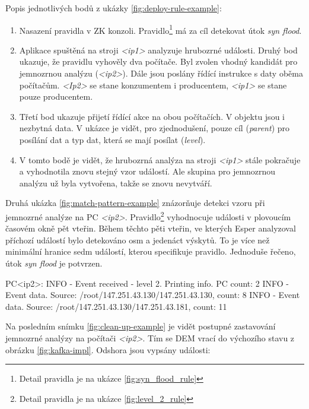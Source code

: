 \documentclass[
  digital, %
  table,   %
  nolof,     %
  nolot,     %
  oneside, %
  nocover,
  monochrome,
  12pt
]{fithesis3}
\begin{document}
Popis jednotlivých bodů z ukázky \ref{fig:deploy-rule-example}:
\begin{enumerate}
  \item Nasazení pravidla v ZK konzoli. Pravidlo\footnote{Detail pravidla je na ukázce \ref{fig:syn_flood_rule}} má za cíl detekovat útok \textit{syn flood}.
  \item Aplikace spuštěná na stroji \textit{<ip1>} analyzuje hrubozrné události. Druhý bod ukazuje, že pravidlu vyhověly dva počítače. Byl zvolen vhodný kandidát pro jemnozrnou analýzu (\textit{<ip2>}). Dále jsou poslány řídící instrukce s daty oběma počítačům. \textit{<Ip2>} se stane konzumentem i producentem, \textit{<ip1>} se stane pouze producentem.
  \item Třetí bod ukazuje přijetí řídící akce na obou počítačích. V objektu jsou i nezbytná data. V ukázce je vidět, pro zjednodušení, pouze cíl (\textit{parent}) pro posílání dat a typ dat, která se mají posílat (\textit{level}).
  \item V tomto bodě je vidět, že hrubozrná analýza na stroji \textit{<ip1>} stále pokračuje a vyhodnotila znovu stejný vzor událostí. Ale skupina pro jemnozrnou analýzu už byla vytvořena, takže se znovu nevytváří.
\end{enumerate}

Druhá ukázka \ref{fig:match-pattern-example} znázorňuje detekci vzoru při jemnozrné analýze na PC \textit{<ip2>}. Pravidlo\footnote{Detail pravidla je na ukázce \ref{fig:level_2_rule}} vyhodnocuje události v plovoucím časovém okně pět vteřin. Během těchto pěti vteřin, ve kterých Esper analyzoval příchozí událostí bylo detekováno osm a jedenáct výskytů. To je více než minimální hranice sedm událostí, kterou specifikuje pravidlo. Jednoduše řečeno, útok \textit{syn flood} je potvrzen.

\begin{center}
\begin{minipage}[H]{\linewidth}
	\begin{mylisting}
PC<ip2>:
INFO - Event received - level 2. Printing info. PC count: 2
INFO - Event data. Source:
	/root/147.251.43.130/147.251.43.130, count: 8
INFO - Event data. Source:
	/root/147.251.43.130/147.251.43.181, count: 11
	\end{mylisting}
	\label{fig:match-pattern-example}
\end{minipage}
\end{center}

Na posledním snímku \ref{fig:clean-up-example} je vidět postupné zastavování jemnozrné analýzy na počítači \textit{<ip2>}. Tím se DEM vrací do výchozího stavu z obrázku \ref{fig:kafka-impl}. Odshora jsou vypsány události:
\end{document}
